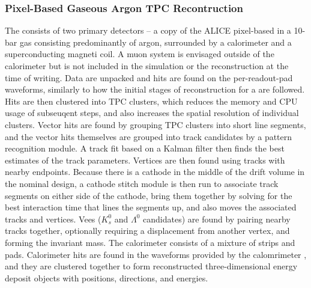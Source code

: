 \subsubsection{Pixel-Based Gaseous Argon TPC Recontruction}
\label{sec:algo:reco:gartpc:pixels}

The  consists of two primary detectors -- a copy of the ALICE pixel-based  in a 10-bar gas consisting predominantly of argon, surrounded by a calorimeter and a superconducting magneti coil.  A muon system is envisaged outside of the calorimeter but is not included in the simulation or the reconstruction at the time of writing.  Data are unpacked and hits are found on the per-readout-pad waveforms, similarly to how the initial stages of reconstruction for a  are followed.  Hits are then clustered into TPC clusters, which reduces the memory and CPU usage of subseuqent steps, and also increases the spatial resolution of individual clusters.  Vector hits are found by grouping TPC clusters into short line segments, and the vector hits themselves are grouped into track candidates by a pattern recognition module.  A track fit based on a Kalman filter then finds the best estimates of the track parameters.  Vertices are then found using tracks with nearby endpoints.  Because there is a cathode in the middle of the drift volume in the nominal design, a cathode stitch module is then run to associate track segments on either side of the cathode, bring them together by solving for the best interaction time that lines the segments up, and also moves the associated tracks and vertices.  Vees ($K^0_s$ and
$\Lambda^0$ candidates) are found by pairing nearby tracks together, optionally requiring a displacement from another vertex, and forming the invariant mass.  The calorimeter consists of a mixture of strips and pads.  Calorimeter hits are found in the  waveforms provided by the calomrimeter , and they are clustered together to form reconstructed three-dimensional energy deposit objects with positions, directions, and energies.

